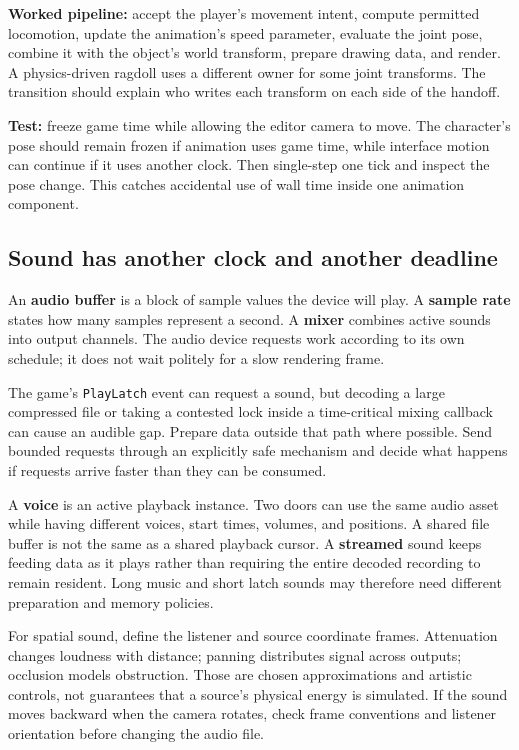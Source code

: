 \textbf{Worked pipeline:} accept the player's movement intent, compute permitted locomotion, update the animation's speed parameter, evaluate the joint pose, combine it with the object's world transform, prepare drawing data, and render. A physics-driven ragdoll uses a different owner for some joint transforms. The transition should explain who writes each transform on each side of the handoff.

\textbf{Test:} freeze game time while allowing the editor camera to move. The character's pose should remain frozen if animation uses game time, while interface motion can continue if it uses another clock. Then single-step one tick and inspect the pose change. This catches accidental use of wall time inside one animation component.

\subsection{Sound has another clock and another deadline}\label{06-engine-ii-ch040-sound-has-another-clock-and-another-deadline}

\hypertarget{06-engine-ii-ch040-sound-has-another-clock-and-another-deadline}{}

An \textbf{audio buffer} is a block of sample values the device will play. A \textbf{sample rate} states how many samples represent a second. A \textbf{mixer} combines active sounds into output channels. The audio device requests work according to its own schedule; it does not wait politely for a slow rendering frame.

The game's \texttt{PlayLatch} event can request a sound, but decoding a large compressed file or taking a contested lock inside a time-critical mixing callback can cause an audible gap. Prepare data outside that path where possible. Send bounded requests through an explicitly safe mechanism and decide what happens if requests arrive faster than they can be consumed.

A \textbf{voice} is an active playback instance. Two doors can use the same audio asset while having different voices, start times, volumes, and positions. A shared file buffer is not the same as a shared playback cursor. A \textbf{streamed} sound keeps feeding data as it plays rather than requiring the entire decoded recording to remain resident. Long music and short latch sounds may therefore need different preparation and memory policies.

For spatial sound, define the listener and source coordinate frames. Attenuation changes loudness with distance; panning distributes signal across outputs; occlusion models obstruction. Those are chosen approximations and artistic controls, not guarantees that a source's physical energy is simulated. If the sound moves backward when the camera rotates, check frame conventions and listener orientation before changing the audio file.

